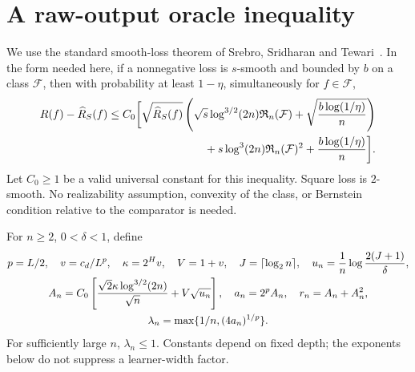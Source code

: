 \documentclass[11pt]{article}
\theoremstyle{remark}\newtheorem{remark}[theorem]{Remark}
\newcommand{\Rad}{\mathfrak R}\newcommand{\KL}{\operatorname{KL}}
\begin{document}
\section{A raw-output oracle inequality}
We use the standard smooth-loss theorem of Srebro, Sridharan and Tewari~\cite{sst}. In the form needed here, if a nonnegative loss is $s$-smooth and bounded by $b$ on a class $\mathcal F$, then with probability at least $1-\eta$, simultaneously for $f\in\mathcal F$,
\begin{align}
 R(f)-\empRisk_S(f)\le C_0\biggl[
 \sqrt{\empRisk_S(f)}\left(\sqrt{s}\log^{3/2}(2n)\Rad_n(\mathcal F)
                   +\sqrt{\frac{b\log(1/\eta)}n}\right)\notag\\
 {}+s\log^3(2n)\Rad_n(\mathcal F)^2
                   +\frac{b\log(1/\eta)}n\biggr].
 \label{eq:sst}
\end{align}
Let $C_0\ge1$ be a valid universal constant for this inequality. Square loss is $2$-smooth. No realizability assumption, convexity of the class, or Bernstein condition relative to the comparator is needed.

For $n\ge2$, $0<\delta<1$, define
\begin{gather}
 p=L/2,\quad v=c_d/L^p,\quad \kappa=2^Hv,\quad V=1+v,
 \quad J=\lceil\log_2n\rceil,\quad
 u_n=\frac1n\log\frac{2(J+1)}\delta,\notag\\
 A_n=C_0\left[\frac{\sqrt2\kappa\log^{3/2}(2n)}{\sqrt n}
                    +V\sqrt{u_n}\right],\quad
 a_n=2^pA_n,\quad r_n=A_n+A_n^2,\notag\\
 \lambda_n=\max\{1/n,(4a_n)^{1/p}\}.
 \label{eq:calibration}
\end{gather}
For sufficiently large $n$, $\lambda_n\le1$. Constants depend on fixed depth; the exponents below do not suppress a learner-width factor.
\end{document}

